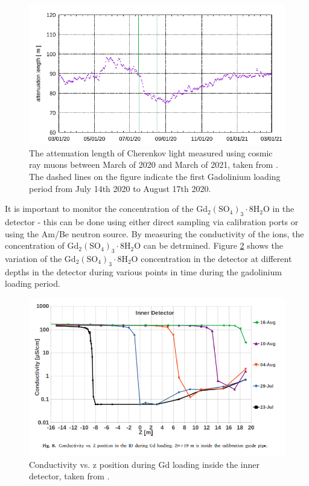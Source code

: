 \begin{figure}
    \includegraphics[width=\textwidth]{Figures/attenuation_length_gd.png}
    \caption{The attenuation length of Cherenkov light measured using cosmic ray muons between March of 2020 and March of 2021, taken from \cite{marti_evaluation_2020}. The dashed lines on the figure indicate the first Gadolinium loading period from July 14th 2020 to August 17th 2020. }
    \label{fig:gdattenuationlength}
\end{figure}

It is important to monitor the concentration of the $\mathrm{Gd}_{2}\left(\mathrm{SO}_{4}\right)_{3} \cdot 8 \mathrm{H}_{2} \mathrm{O}$ in the detector - this can be done using either direct sampling via calibration ports or using the Am/Be neutron source. By measuring the conductivity of the ions, the concentration of $\mathrm{Gd}_{2}\left(\mathrm{SO}_{4}\right)_{3} \cdot 8 \mathrm{H}_{2} \mathrm{O}$ can be detrmined. Figure \ref{fig:gdconductivity} shows the variation of the $\mathrm{Gd}_{2}\left(\mathrm{SO}_{4}\right)_{3} \cdot 8 \mathrm{H}_{2} \mathrm{O}$ concentration in the detector at different depths in the detector during various points in time during the gadolinium loading period. 

\begin{figure}
    \includegraphics[width=\textwidth]{Figures/gd_conductivity.png}
    \caption{Conductivity vs. z position during Gd loading inside the inner detector, taken from \cite{abe_first_2021}.}
    \label{fig:gdconductivity}
\end{figure}


